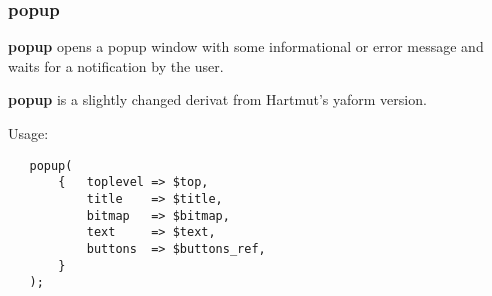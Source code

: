 \subsubsection*{popup\label{popup}}


\textbf{popup} opens a popup window with some informational or error message
and waits for a notification by the user.



\textbf{popup} is a slightly changed derivat from Hartmut's yaform version.



Usage:

\begin{verbatim}
   popup(
       {   toplevel => $top,
           title    => $title,
           bitmap   => $bitmap,
           text     => $text,
           buttons  => $buttons_ref,
       }
   );
\end{verbatim}
